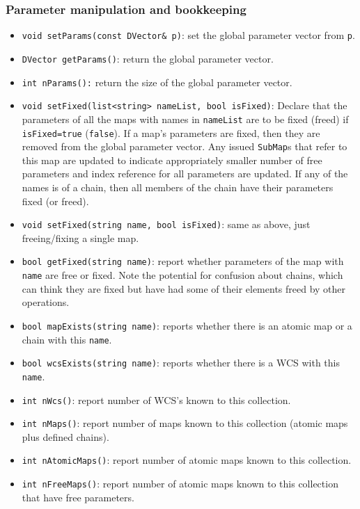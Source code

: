 \documentclass[11pt,preprint,flushrt]{aastex}
\begin{document}
\subsubsection{Parameter manipulation and bookkeeping}
\begin{itemize}
\item {\tt  void setParams(const DVector\& p)}: set the global parameter vector from {\tt p}.
\item {\tt  DVector getParams()}: return the global parameter vector.
\item {\tt  int nParams():} return the size of the global parameter vector.
\item {\tt void setFixed(list<string> nameList, bool isFixed)}: Declare that the parameters of all the maps with names in {\tt nameList} are to be fixed (freed) if {\tt isFixed=true} ({\tt false}).  If a map's parameters are fixed, then they are removed from the global parameter vector.  Any issued {\tt SubMap}s that refer to this map are updated to indicate appropriately smaller number of free parameters and index reference for all parameters are updated.  If any of the names is of a chain, then all members of the chain have their parameters fixed (or freed).
\item {\tt void setFixed(string name, bool isFixed)}: same as above, just freeing/fixing a single map.
\item {\tt bool getFixed(string name)}: report whether parameters of the map with {\tt name} are free or fixed.  Note the potential for confusion about chains, which can think they are fixed but have had some of their elements freed by other operations.
\item {\tt bool mapExists(string name)}: reports whether there is an atomic map or a chain with this {\tt name}.
\item {\tt bool wcsExists(string name)}: reports whether there is a WCS with this {\tt name}.
\item {\tt int nWcs()}: report number of WCS's known to this collection.
\item {\tt int nMaps()}: report number of maps known to this collection (atomic maps plus defined chains).
\item {\tt int nAtomicMaps()}: report number of atomic maps known to this collection.
\item {\tt int nFreeMaps()}: report number of atomic maps known to this collection that have free parameters.
\end{itemize}
\end{document}
